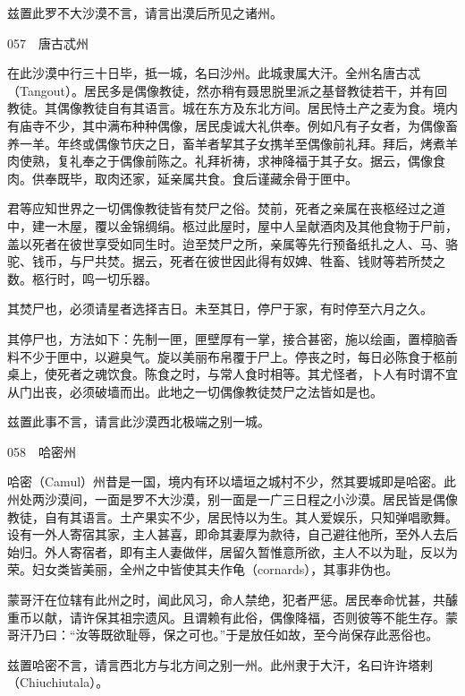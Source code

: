 \documentclass[12pt,UTF8]{ctexbook}
\begin{document}
兹置此罗不大沙漠不言，请言出漠后所见之诸州。





057　唐古忒州

在此沙漠中行三十日毕，抵一城，名曰沙州。此城隶属大汗。全州名唐古忒（Tangout）。居民多是偶像教徒，然亦稍有聂思脱里派之基督教徒若干，并有回教徒。其偶像教徒自有其语言。城在东方及东北方间。居民恃土产之麦为食。境内有庙寺不少，其中满布种种偶像，居民虔诚大礼供奉。例如凡有子女者，为偶像畜养一羊。年终或偶像节庆之日，畜羊者挈其子女携羊至偶像前礼拜。拜后，烤煮羊肉使熟，复礼奉之于偶像前陈之。礼拜祈祷，求神降福于其子女。据云，偶像食肉。供奉既毕，取肉还家，延亲属共食。食后谨藏余骨于匣中。

君等应知世界之一切偶像教徒皆有焚尸之俗。焚前，死者之亲属在丧柩经过之道中，建一木屋，覆以金锦绸绢。柩过此屋时，屋中人呈献酒肉及其他食物于尸前，盖以死者在彼世享受如同生时。迨至焚尸之所，亲属等先行预备纸扎之人、马、骆驼、钱币，与尸共焚。据云，死者在彼世因此得有奴婢、牲畜、钱财等若所焚之数。柩行时，鸣一切乐器。

其焚尸也，必须请星者选择吉日。未至其日，停尸于家，有时停至六月之久。

其停尸也，方法如下：先制一匣，匣壁厚有一掌，接合甚密，施以绘画，置樟脑香料不少于匣中，以避臭气。旋以美丽布帛覆于尸上。停丧之时，每日必陈食于柩前桌上，使死者之魂饮食。陈食之时，与常人食时相等。其尤怪者，卜人有时谓不宜从门出丧，必须破墙而出。此地之一切偶像教徒焚尸之法皆如是也。

兹置此事不言，请言此沙漠西北极端之别一城。





058　哈密州

哈密（Camul）州昔是一国，境内有环以墙垣之城村不少，然其要城即是哈密。此州处两沙漠间，一面是罗不大沙漠，别一面是一广三日程之小沙漠。居民皆是偶像教徒，自有其语言。土产果实不少，居民恃以为生。其人爱娱乐，只知弹唱歌舞。设有一外人寄宿其家，主人甚喜，即命其妻厚为款待，自己避往他所，至外人去后始归。外人寄宿者，即有主人妻做伴，居留久暂惟意所欲，主人不以为耻，反以为荣。妇女类皆美丽，全州之中皆使其夫作龟（cornards），其事非伪也。

蒙哥汗在位辖有此州之时，闻此风习，命人禁绝，犯者严惩。居民奉命忧甚，共醵重币以献，请许保其祖宗遗风。且谓赖有此俗，偶像降福，否则彼等不能生存。蒙哥汗乃曰：“汝等既欲耻辱，保之可也。”于是放任如故，至今尚保存此恶俗也。

兹置哈密不言，请言西北方与北方间之别一州。此州隶于大汗，名曰许许塔剌（Chiuchiutala）。
\end{document}
